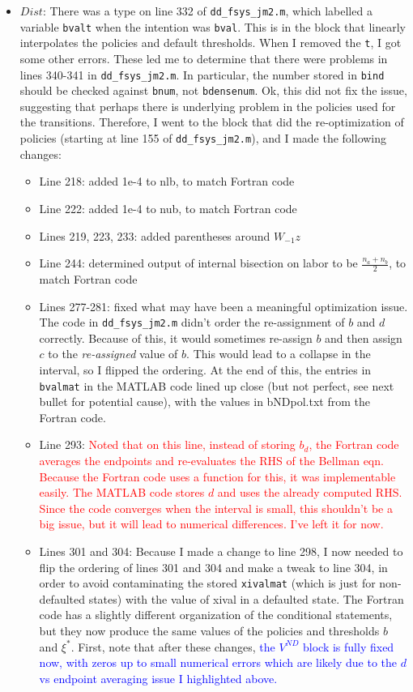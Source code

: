 \documentclass[12pt]{article}
\begin{document}
\begin{itemize}
\begin{itemize}
\item $Dist$: There was a type on line 332 of \texttt{dd\_fsys\_jm2.m}, which labelled a variable \texttt{bvalt} when the intention was \texttt{bval}. This is in the block that linearly interpolates the policies and default thresholds. When I removed the \texttt{t}, I got some other errors. These led me to determine that there were problems in lines 340-341 in \texttt{dd\_fsys\_jm2.m}. In particular, the number stored in \texttt{bind} should be checked against \texttt{bnum}, not \texttt{bdensenum}. Ok, this did not fix the issue, suggesting that perhaps there is underlying problem in the policies used for the transitions. Therefore, I went to the block that did the re-optimization of policies (starting at line 155 of \texttt{dd\_fsys\_jm2.m}), and I made the following changes:
\begin{itemize}
\item Line 218: added 1e-4 to nlb, to match Fortran code
\item Line 222: added 1e-4 to nub, to match Fortran code
\item Lines 219, 223, 233: added parentheses around $W_{-1}z$
\item Line 244: determined output of internal bisection on labor to be $\frac{n_a + n_b}{2}$, to match Fortran code
\item Lines 277-281: fixed what may have been a meaningful optimization issue. The code in \texttt{dd\_fsys\_jm2.m} didn't order the re-assignment of $b$ and $d$ correctly. Because of this, it would sometimes re-assign $b$ and then assign $c$ to the \textit{re-assigned} value of $b$. This would lead to a collapse in the interval, so I flipped the ordering. At the end of this, the entries in \texttt{bvalmat} in the MATLAB code lined up close (but not perfect, see next bullet for potential cause), with the values in bNDpol.txt from the Fortran code.
\item Line 293: \textcolor{red}{Noted that on this line, instead of storing $b_d$, the Fortran code averages the endpoints and re-evaluates the RHS of the Bellman eqn. Because the Fortran code uses a function for this, it was implementable easily. The MATLAB code stores $d$ and uses the already computed RHS. Since the code converges when the interval is small, this shouldn't be a big issue, but it will lead to numerical differences. I've left it for now.}
\item Lines 301 and 304: Because I made a change to line 298, I now needed to flip the ordering of lines 301 and 304 and make a tweak to line 304, in order to avoid contaminating the stored \texttt{xivalmat} (which is just for non-defaulted states) with the value of xival in a defaulted state. The Fortran code has a slightly different organization of the conditional statements, but they now produce the same values of the policies and thresholds $b$ and $\xi^*$. First, note that after these changes, \textcolor{blue}{the $V^{ND}$ block is fully fixed now, with zeros up to small numerical errors which are likely due to the $d$ vs endpoint averaging issue I highlighted above.} 

\end{itemize}
\end{itemize}
\end{itemize}
\end{document}
